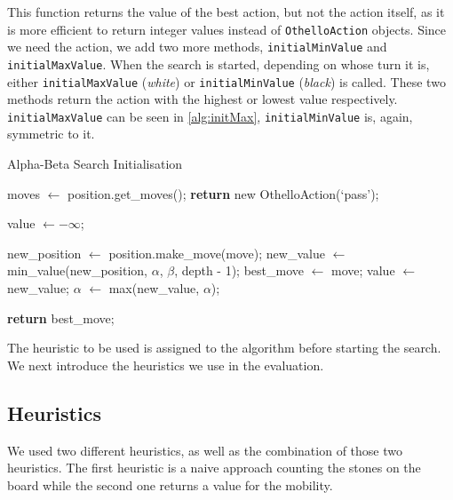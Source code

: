 This function returns the value of the best action, but not the action itself, as it is more efficient to return integer values instead of \texttt{OthelloAction} objects.
Since we need the action, we add two more methods, \texttt{initialMinValue} and \texttt{initialMaxValue}.
When the search is started, depending on whose turn it is, either \texttt{initialMaxValue} (\textit{white}) or \texttt{initialMinValue} (\textit{black}) is called.
These two methods return the action with the highest or lowest value respectively.
\texttt{initialMaxValue} can be seen in \cref{alg:initMax}, \texttt{initialMinValue} is, again, symmetric to it.

\begin{algorithm}[H]
    \caption{Alpha-Beta Search Initialisation}
    \label{alg:initMax}
    \begin{algorithmic}[1]
            \State moves $\leftarrow$ position.get\_moves();
                \State \textbf{return} new OthelloAction(\lq pass\rq);
            \EndIf

            \State value $\leftarrow -\infty$;

                \State new\_position $\leftarrow$ position.make\_move(move);
                \State new\_value $\leftarrow$ min\_value(new\_position, $\alpha$, $\beta$, depth - 1);
                    \State best\_move $\leftarrow$ move;
                    \State value $\leftarrow$ new\_value;
                    \State $\alpha$ $\leftarrow$ max(new\_value, $\alpha$);
                \EndIf
            \EndFor 
            
            \State \textbf{return} best\_move;
        \EndFunction
    \end{algorithmic}
\end{algorithm}

The heuristic to be used is assigned to the algorithm before starting the search.
We next introduce the heuristics we use in the evaluation.

\subsection{Heuristics}
We used two different heuristics, as well as the combination of those two heuristics.
The first heuristic is a naive approach counting the stones on the board while the second one returns a value for the mobility.


